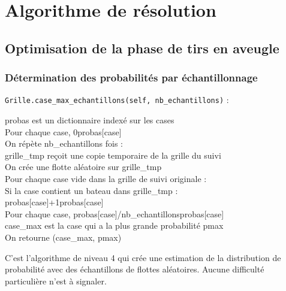 \newpage
\section{Algorithme de résolution}
\subsection{Optimisation de la phase de tirs en aveugle}
\subsubsection{Détermination des probabilités par échantillonnage}\label{case_max_echantillons}

\texttt{Grille.case\_max\_echantillons(self, nb\_echantillons)} :
\begin{algo1}
probas est un dictionnaire indexé sur les cases\\
Pour chaque case, 0\sto probas[case]\\
On répète nb\_echantillons fois :\\
grille\_tmp reçoit une copie temporaire de la grille du suivi\\
On crée une flotte aléatoire sur grille\_tmp\\
Pour chaque case vide dans la grille de suivi originale :\\
Si la case contient un bateau dans grille\_tmp :\\
probas[case]+1\sto probas[case]\\
Pour chaque case, probas[case]/nb\_echantillons\sto probas[case]\\
case\_max est la case qui a la plus grande probabilité pmax\\
On retourne (case\_max, pmax)\\
\end{algo1}

C'est l'algorithme de niveau 4 qui crée une estimation de la distribution de probabilité avec des échantillons de flottes aléatoires. Aucune difficulté particulière n'est à signaler.


